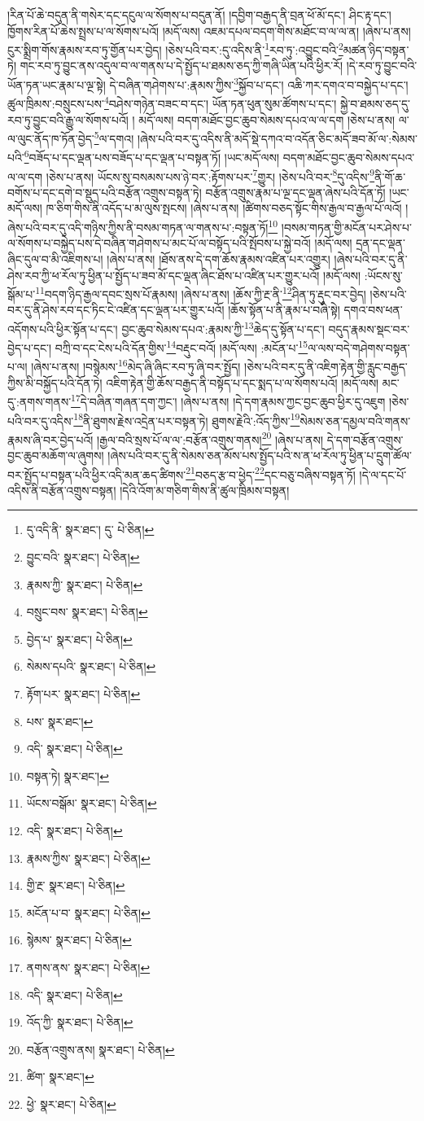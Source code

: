 །རིན་པོ་ཆེ་བདུན་ནི་གསེར་དང་དངུལ་ལ་སོགས་པ་བདུན་ནོ། །དབྱིག་བརྒྱད་ནི་བྲན་ཕོ་མོ་དང་། ཤིང་རྟ་དང་། ཁྱོགས་རིན་པོ་ཆེས་སྤྲས་པ་ལ་སོགས་པའོ། །མདོ་ལས། འཇམ་དཔལ་བདག་གིས་མཐོང་བ་ལ་ལ་ན། །ཞེས་པ་ནས། ངུར་སྨྲིག་གོས་རྣམས་རབ་ཏུ་གྱོན་པར་བྱེད། །ཅེས་པའི་བར་:དུ་འདིས་ནི་\footnote{དུ་འདི་ནི་  སྣར་ཐང་། དུ་  པེ་ཅིན། }རབ་ཏུ་:འབྱུང་བའི་\footnote{བྱུང་བའི་  སྣར་ཐང་།  པེ་ཅིན། }མཚན་ཉིད་བསྟན་ཏེ། གང་རབ་ཏུ་བྱུང་ནས་འདུལ་བ་ལ་གནས་པ་དེ་སྤྱོད་པ་ཐམས་ཅད་ཀྱི་གཞི་ཡིན་པའི་ཕྱིར་རོ། །དེ་རབ་ཏུ་བྱུང་བའི་ཡོན་ཏན་ཡང་རྣམ་པ་ལྔ་སྟེ། དེ་བཞིན་གཤེགས་པ་:རྣམས་ཀྱིས་\footnote{རྣམས་ཀྱི་  སྣར་ཐང་།  པེ་ཅིན། }སྐྱོབ་པ་དང་། འཆི་ཀར་དགའ་བ་བསྐྱེད་པ་དང་། ཚུལ་ཁྲིམས་:བསྲུངས་པས་\footnote{བསྲུང་བས་  སྣར་ཐང་།  པེ་ཅིན། }བཤེས་གཉེན་བཟང་བ་དང་། ཡོན་ཏན་ཕུན་སུམ་ཚོགས་པ་དང་། སྐྱེ་བ་ཐམས་ཅད་དུ་རབ་ཏུ་བྱུང་བའི་རྒྱུ་ལ་སོགས་པའོ། །
མདོ་ལས། བདག་མཐོང་བྱང་ཆུབ་སེམས་དཔའ་ལ་ལ་དག །ཅེས་པ་ནས། ལ་ལ་ལུང་ནོད་ཁ་ཏོན་བྱེད་\footnote{བྱེད་པ་  སྣར་ཐང་།  པེ་ཅིན། }ལ་དགའ། །ཞེས་པའི་བར་དུ་འདིས་ནི་མདོ་སྡེ་དཀའ་བ་འདོན་ཅིང་མདོ་ཟབ་མོ་ལ་:སེམས་པའི་\footnote{སེམས་དཔའི་  སྣར་ཐང་།  པེ་ཅིན། }བཟོད་པ་དང་ལྡན་པས་བཟོད་པ་དང་ལྡན་པ་བསྟན་ཏོ། །ཡང་མདོ་ལས། བདག་མཐོང་བྱང་ཆུབ་སེམས་དཔའ་ལ་ལ་དག །ཅེས་པ་ནས། ཡོངས་སུ་བསམས་པས་ཉེ་བར་:རྟོགས་པར་\footnote{རྟོག་པར་  སྣར་ཐང་།  པེ་ཅིན། }གྱུར། །ཅེས་པའི་བར་\footnote{པས་  སྣར་ཐང་། }དུ་འདིས་\footnote{འདི་  སྣར་ཐང་།  པེ་ཅིན། }ནི་གོ་ཆ་བགོས་པ་དང་དགེ་བ་སྡུད་པའི་བརྩོན་འགྲུས་བསྟན་ཏེ། བརྩོན་འགྲུས་རྣམ་པ་ལྔ་དང་ལྡན་ཞེས་པའི་དོན་ཏོ། །ཡང་མདོ་ལས། ཁ་ཅིག་གིས་ནི་འདོད་པ་མ་ལུས་སྤངས། །ཞེས་པ་ནས། །ཚིགས་བཅད་སྟོང་གིས་རྒྱལ་བ་རྒྱལ་པོ་ལའོ། །ཞེས་པའི་བར་དུ་འདི་གཉིས་ཀྱིས་ནི་བསམ་གཏན་ལ་གནས་པ་:བསྟན་ཏོ།\footnote{བསྟན་ཏེ།  སྣར་ཐང་། } །བསམ་གཏན་གྱི་མངོན་པར་ཤེས་པ་ལ་སོགས་པ་བསྐྱེད་པས་དེ་བཞིན་གཤེགས་པ་མང་པོ་ལ་བསྟོད་པའི་སྤོབས་པ་སྐྱེ་བའོ། །མདོ་ལས། དྲན་དང་ལྡན་ཞིང་དུལ་བ་མི་འཇིགས་པ། །ཞེས་པ་ནས། །ཐོས་ནས་དེ་དག་ཆོས་རྣམས་འཛིན་པར་འགྱུར། །ཞེས་པའི་བར་དུ་ནི་ཤེས་རབ་ཀྱི་ཕ་རོལ་ཏུ་ཕྱིན་པ་སྤྱོད་པ་ཟབ་མོ་དང་ལྡན་ཞིང་ཐོས་པ་འཛིན་པར་གྱུར་པའོ། །མདོ་ལས། :ཡོངས་སུ་སྒོམ་པ་\footnote{ཡོངས་བསྒོམ་  སྣར་ཐང་།  པེ་ཅིན། }བདག་ཉིད་རྒྱལ་དབང་སྲས་པོ་རྣམས། །ཞེས་པ་ནས། །ཆོས་ཀྱི་རྔ་ནི་\footnote{འདི་  སྣར་ཐང་།  པེ་ཅིན། }ཤིན་ཏུ་རྡུང་བར་བྱེད། །ཅེས་པའི་བར་དུ་ནི་ཤེས་རབ་དང་ཏིང་ངེ་འཛིན་དང་ལྡན་པར་གྱུར་པའོ། །ཆོས་སྟོན་པ་ནི་རྣམ་པ་བཞི་སྟེ། དགའ་བས་ཕན་འདོགས་པའི་ཕྱིར་སྟོན་པ་དང་། བྱང་ཆུབ་སེམས་དཔའ་:རྣམས་ཀྱི་\footnote{རྣམས་ཀྱིས་  སྣར་ཐང་།  པེ་ཅིན། }ཆེད་དུ་སྟོན་པ་དང་། བདུད་རྣམས་སྡང་བར་བྱེད་པ་དང་། བཀྲི་བ་དང་ངེས་པའི་དོན་གྱིས་\footnote{གྱི་རྔ་  སྣར་ཐང་།  པེ་ཅིན། }བརྡུང་བའོ། །མདོ་ལས། :མངོན་པ་\footnote{མངོན་པ་བ་  སྣར་ཐང་།  པེ་ཅིན། }ལ་ལས་བདེ་གཤེགས་བསྟན་པ་ལ། །ཞེས་པ་ནས། །བསྙེམས་\footnote{སྙེམས་  སྣར་ཐང་།  པེ་ཅིན། }མེད་ཞི་ཞིང་རབ་ཏུ་ཞི་བར་སྤྱོད། །ཅེས་པའི་བར་དུ་ནི་འཇིག་རྟེན་གྱི་རླུང་བརྒྱད་ཀྱིས་མི་བསྐྱོད་པའི་དོན་ཏེ། འཇིག་རྟེན་གྱི་ཆོས་བརྒྱད་ནི་བསྟོད་པ་དང་སྨད་པ་ལ་སོགས་པའོ། །མདོ་ལས། མང་དུ་:ནགས་གནས་\footnote{ནགས་ནས་  སྣར་ཐང་།  པེ་ཅིན། }དེ་བཞིན་གཞན་དག་ཀྱང་། །ཞེས་པ་ནས། །དེ་དག་རྣམས་ཀྱང་བྱང་ཆུབ་ཕྱིར་དུ་འཇུག །ཅེས་པའི་བར་དུ་འདིས་\footnote{འདི་  སྣར་ཐང་།  པེ་ཅིན། }ནི་ཐུགས་རྗེས་འདྲེན་པར་བསྟན་ཏེ། ཐུགས་རྗེའི་:འོད་ཀྱིས་\footnote{འོད་ཀྱི་  སྣར་ཐང་།  པེ་ཅིན། }སེམས་ཅན་དམྱལ་བའི་གནས་རྣམས་ཞི་བར་བྱེད་པའོ། །རྒྱལ་བའི་སྲས་པོ་ལ་ལ་:བརྩོན་འགྲུས་གནས།\footnote{བརྩོན་འགྲུས་ནས།  སྣར་ཐང་།  པེ་ཅིན། } །ཞེས་པ་ནས། དེ་དག་བརྩོན་འགྲུས་བྱང་ཆུབ་མཆོག་ལ་ཞུགས། །ཞེས་པའི་བར་དུ་ནི་སེམས་ཅན་མོས་པས་སྤྱོད་པའི་ས་ན་ཕ་རོལ་ཏུ་ཕྱིན་པ་དྲུག་ཚོལ་བར་སྤྱོད་པ་བསྟན་པའི་ཕྱིར་འདི་མན་ཆད་ཚིགས་\footnote{ཚིག་  སྣར་ཐང་། }བཅད་རྩ་བ་ཕྱེད་\footnote{ཕྱེ་  སྣར་ཐང་།  པེ་ཅིན། }དང་བཅུ་བཞིས་བསྟན་ཏོ། །དེ་ལ་དང་པོ་འདིས་ནི་བརྩོན་འགྲུས་བསྟན། །དེའི་འོག་མ་གཅིག་གིས་ནི་ཚུལ་ཁྲིམས་བསྟན། 